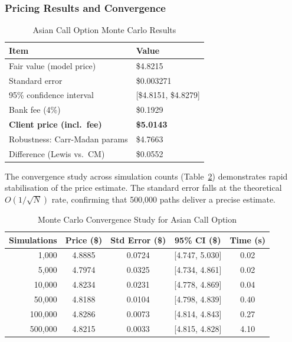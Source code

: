 \documentclass[12pt,a4paper]{article}
\newcommand{\thead}[1]{\cellcolor{headernavy}\color{white}\textbf{#1}}
\newcommand{\rowA}{\rowcolor{white}}
\newcommand{\rowB}{\rowcolor{rowgray}}
\begin{document}
\subsubsection{Pricing Results and Convergence}

\begin{table}[H]
  \centering
  \caption{Asian Call Option Monte Carlo Results}
  \label{tab:asian_results}
  \begin{tabular}{ll}
    \hline
    \thead{Item} & \thead{Value} \\
    \hline
    \rowA Fair value (model price)           & \$4.8215 \\
    \rowB Standard error                     & \$0.003271 \\
    \rowA 95\% confidence interval           & [\$4.8151, \$4.8279] \\
    \rowB Bank fee (4\%)                     & \$0.1929 \\
    \rowA \textbf{Client price (incl.\ fee)} & \textbf{\$5.0143} \\
    \hline
    \rowB Robustness: Carr-Madan params      & \$4.7663 \\
    \rowA Difference (Lewis vs.\ CM)         & \$0.0552 \\
    \hline
  \end{tabular}
\end{table}

The convergence study across simulation counts (Table~\ref{tab:mc_convergence}) demonstrates rapid stabilisation of the price estimate. The standard error falls at the theoretical $O(1/\sqrt{N})$ rate, confirming that 500,000 paths deliver a precise estimate.

\begin{table}[H]
  \centering
  \caption{Monte Carlo Convergence Study for Asian Call Option}
  \label{tab:mc_convergence}
  \begin{tabular}{rcccc}
    \hline
    \thead{Simulations} & \thead{Price (\$)} & \thead{Std Error (\$)} & \thead{95\% CI (\$)} & \thead{Time (s)} \\
    \hline
    \rowA   1,000 & 4.8885 & 0.0724 & [4.747, 5.030] & 0.02 \\
    \rowB   5,000 & 4.7974 & 0.0325 & [4.734, 4.861] & 0.02 \\
    \rowA  10,000 & 4.8234 & 0.0231 & [4.778, 4.869] & 0.04 \\
    \rowB  50,000 & 4.8188 & 0.0104 & [4.798, 4.839] & 0.40 \\
    \rowA 100,000 & 4.8286 & 0.0073 & [4.814, 4.843] & 0.27 \\
    \rowB 500,000 & 4.8215 & 0.0033 & [4.815, 4.828] & 4.10 \\
    \hline
  \end{tabular}
\end{table}
\end{document}
